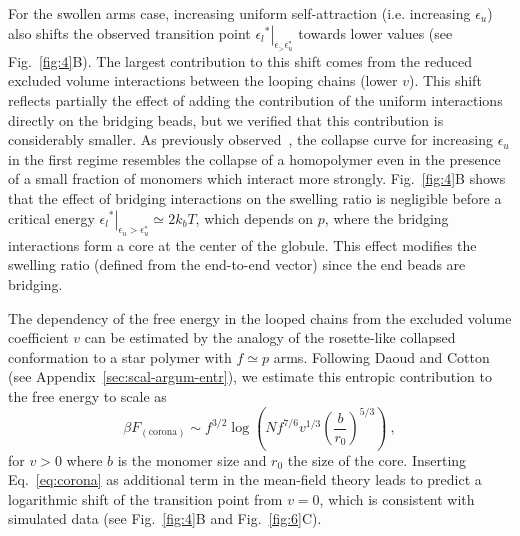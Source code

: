 \documentclass[
preprint,
a4paper,
12pt,
superscriptaddress,
pre]{revtex4}
\begin{document}
For the swollen arms case, increasing uniform self-attraction
(i.e. increasing $\epsilon_u$) also shifts the observed transition
point $\left.{\epsilon_l}^*\right|_{\epsilon_ > \epsilon_u^*}$ towards
lower values (see Fig.~\ref{fig:4}B).  The largest contribution to
this shift comes from the reduced excluded volume interactions between
the looping chains (lower $v$). This shift reflects partially the
effect of adding the contribution of the uniform interactions directly
on the bridging beads, but we verified that this contribution is
considerably smaller.
As previously observed~\cite{Dasmahapatra2006}, the collapse curve for
increasing $\epsilon_u$ in the first regime resembles the collapse of
a homopolymer even in the presence of a small fraction of monomers
which interact more strongly. Fig.~\ref{fig:4}B shows that the effect
of bridging interactions on the swelling ratio is negligible before a
critical energy $\left.{\epsilon_l}^*\right|_{\epsilon_u >
  \epsilon_u^*} \simeq 2k_bT$, which depends on $p$, where the
bridging interactions form a core at the center of the globule. This
effect modifies the swelling ratio (defined from the end-to-end
vector) since the end beads are bridging.
% 

The dependency of the free energy in the looped chains from the
excluded volume coefficient $v$ can be estimated by the analogy of the
rosette-like collapsed conformation to a star polymer with $f \simeq
p$ arms. Following Daoud and Cotton~\cite{Daoud1982} (see
Appendix~\ref{sec:scal-argum-entr}), we estimate this entropic
contribution to the free energy to scale as
\begin{equation}
\beta F_\mathrm{(corona)} \sim f^{3/2} \log\left(Nf^{7/6} v^{1/3}
  \left( \frac{b}{r_0}\right)^{5/3} \right) \ ,
\label{eq:corona}
\end{equation}
for $v>0$ where $b$ is the monomer size and $r_0$ the size of the core. 
Inserting Eq.~\eqref{eq:corona} as additional term in the mean-field
theory leads to predict a logarithmic shift of the transition point
from $v = 0$, which is consistent with simulated data
(see Fig.~\ref{fig:4}B and Fig.~\ref{fig:6}C).
\end{document}

